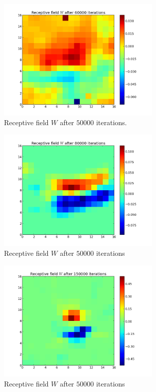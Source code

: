 \begin{figure}[h]
\centering
\includegraphics[width=0.7\textwidth]{../ex3/results1/img07}
\caption{Receptive field $W$ after $50000$ iterations. }
\label{fig:img07}
\end{figure}

\begin{figure}[h]
\centering
\includegraphics[width=0.7\textwidth]{../ex3/results1/img09}
\caption{}
\caption{Receptive field $W$ after $50000$ iterations}
\label{fig:img09}
\end{figure}

\begin{figure}[h]
\centering
\includegraphics[width=0.7\textwidth]{../ex3/results1/img16}
\caption{}
\caption{Receptive field $W$ after $50000$ iterations}
\label{fig:img16}
\end{figure}

